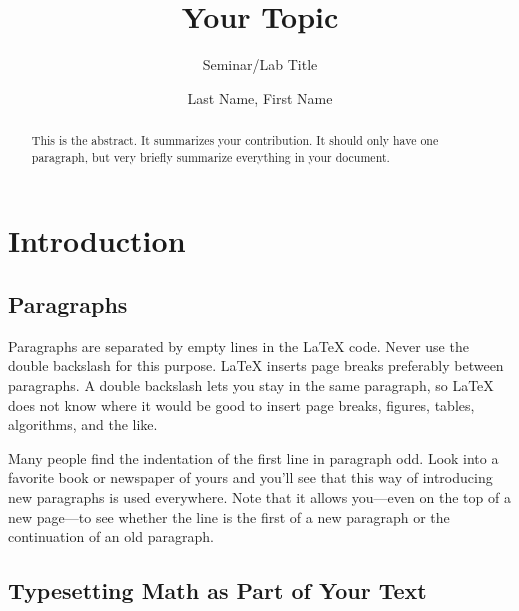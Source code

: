 \documentclass[runningheads,a4paper]{llncs}
\begin{document}
%
\frontmatter          %
%
\pagestyle{headings}  %
%
\mainmatter              %
%
\title{Your Topic}
\subtitle{Seminar/Lab Title}
%
%
\author{Last Name, First Name}
%

\maketitle              %

\begin{abstract}
    This is  the abstract. It summarizes your  contribution. It should only
    have one paragraph, but very briefly summarize everything in your document.
\end{abstract}

\section{Introduction}

\subsection{Paragraphs}
\label{sec:paras}

Paragraphs are separated  by empty lines in the  \LaTeX{} code.  Never 
use  the double  backslash for  this purpose.   \LaTeX{} inserts  page 
breaks  preferably between  paragraphs.  A  double backslash  lets you 
stay in the  same paragraph, so \LaTeX{} does not  know where it would 
be good  to insert page  breaks, figures, tables, algorithms,  and the 
like.                                                                  

Many  people find  the  indentation  of the  first  line in  paragraph 
odd.  Look into  a favorite book or newspaper of  yours and you'll see 
that this way of introducing  new paragraphs is used everywhere.  Note 
that it  allows you---even on the  top of a new  page---to see whether 
the line is the first of a new paragraph or the continuation of an old 
paragraph.                                                             

\subsection{Typesetting Math as Part of Your Text}
\end{document}

